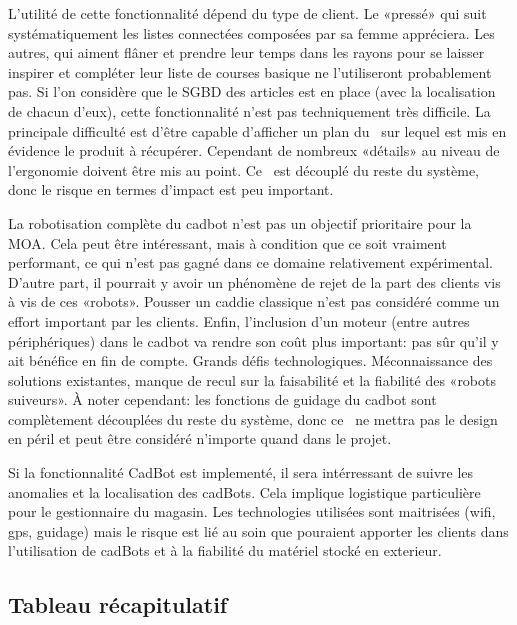 \startnote
{} L'utilité de cette fonctionnalité dépend du type de client.
Le «pressé» qui suit systématiquement les listes connectées composées par sa femme appréciera.
Les autres, qui aiment flâner et prendre leur temps dans les rayons pour se laisser inspirer et compléter leur liste de courses basique ne l'utiliseront probablement pas.
Si l'on considère que le SGBD des articles est en place (avec la localisation de chacun d'eux), cette fonctionnalité n'est pas techniquement très difficile.
La principale difficulté est d'être capable d'afficher un plan du \fm\ sur lequel est mis en évidence le produit à récupérer.
Cependant de nombreux «détails» au niveau de l'ergonomie doivent être mis au point.
Ce \cu\ est découplé du reste du système, donc le risque en termes d'impact est peu important.
\stopnote

\startnote
{} La robotisation complète du cadbot n'est pas un objectif prioritaire pour la MOA.
Cela peut être intéressant, mais à condition que ce soit vraiment performant, ce qui n'est pas gagné dans ce domaine relativement expérimental. 
D'autre part, il pourrait y avoir un phénomène de rejet de la part des clients vis à vis de ces «robots».
Pousser un caddie classique n'est pas considéré comme un effort important par les clients.
Enfin, l'inclusion d'un moteur (entre autres périphériques) dans le cadbot va rendre son coût plus important: pas sûr qu'il y ait bénéfice en fin de compte.
 Grands défis technologiques. Méconnaissance des solutions existantes, manque de recul sur la faisabilité et la fiabilité des «robots suiveurs». 
À noter cependant: les fonctions de guidage du cadbot sont complètement découplées du reste du système, donc ce \cu\ ne mettra pas le design en péril et peut être considéré n'importe quand dans le projet.
\stopnote

\startnote
{} Si la fonctionnalité CadBot est implementé, il sera intérressant de suivre les anomalies et la localisation des cadBots. Cela implique logistique particulière pour le gestionnaire du magasin.
 Les technologies utilisées sont maitrisées (wifi, gps, guidage) mais le risque est lié au soin que pouraient apporter les clients dans l'utilisation de cadBots et à la fiabilité du matériel stocké en exterieur.
\stopnote



\subsection{Tableau récapitulatif}

